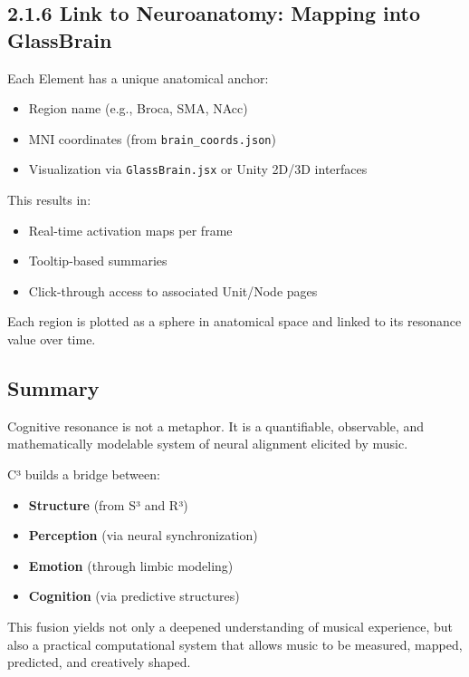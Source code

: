 \documentclass[10pt]{article}
\begin{document}
\subsection*{2.1.6 Link to Neuroanatomy: Mapping into GlassBrain}

Each Element has a unique anatomical anchor:

\begin{itemize}
    \item Region name (e.g., Broca, SMA, NAcc)
    \item MNI coordinates (from \texttt{brain\_coords.json})
    \item Visualization via \texttt{GlassBrain.jsx} or Unity 2D/3D interfaces
\end{itemize}

This results in:

\begin{itemize}
    \item Real-time activation maps per frame
    \item Tooltip-based summaries
    \item Click-through access to associated Unit/Node pages
\end{itemize}

Each region is plotted as a sphere in anatomical space and linked to its resonance value over time.

\subsection*{Summary}

Cognitive resonance is not a metaphor. It is a quantifiable, observable, and mathematically modelable system of neural alignment elicited by music.

C³ builds a bridge between:

\begin{itemize}
    \item \textbf{Structure} (from S³ and R³)
    \item \textbf{Perception} (via neural synchronization)
    \item \textbf{Emotion} (through limbic modeling)
    \item \textbf{Cognition} (via predictive structures)
\end{itemize}

This fusion yields not only a deepened understanding of musical experience, but also a practical computational system that allows music to be measured, mapped, predicted, and creatively shaped.
\end{document}
